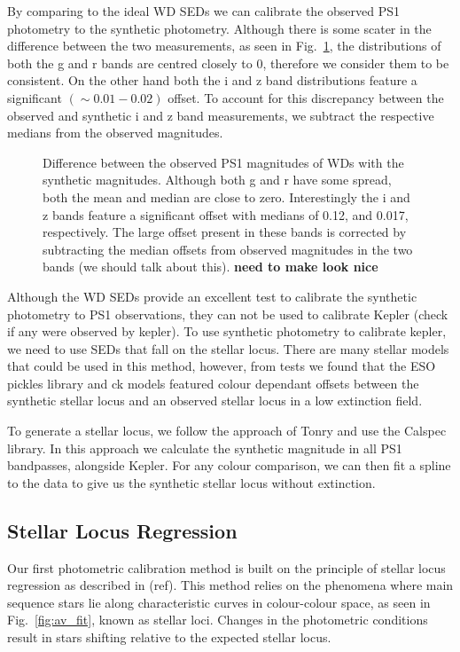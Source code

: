 \documentclass{aastex63}
\begin{document}
By comparing to the ideal WD SEDs we can calibrate the observed PS1 photometry to the synthetic photometry. Although there is some scater in the difference between the two measurements, as seen in Fig.~\ref{fig:wd}, the distributions of both the g and r bands are centred closely to 0, therefore we consider them to be consistent. On the other hand both the i and z band distributions feature a significant $(\sim 0.01-0.02)$ offset. To account for this discrepancy between the observed and synthetic i and z band measurements, we subtract the respective medians from the observed magnitudes. 

\begin{figure}
\caption{Difference between the observed PS1 magnitudes of WDs with the synthetic magnitudes. Although both g and r have some spread, both the mean and median are close to zero. Interestingly the i and z bands feature a significant offset with medians of 0.12, and 0.017, respectively. The large offset present in these bands is corrected by subtracting the median offsets from observed magnitudes in the two bands (we should talk about this). \textbf{need to make look nice}  \label{fig:wd}}
\end{figure}

Although the WD SEDs provide an excellent test to calibrate the synthetic photometry to PS1 observations, they can not be used to calibrate Kepler (check if any were observed by kepler). To use synthetic photometry to calibrate kepler, we need to use SEDs that fall on the stellar locus. There are many stellar models that could be used in this method, however, from tests we found that the ESO pickles library and ck models featured colour dependant offsets between the synthetic stellar locus and an observed stellar locus in a low extinction field. 

To generate a stellar locus, we follow the approach of Tonry and use the Calspec library. In this approach we calculate the synthetic magnitude in all PS1 bandpasses, alongside Kepler. For any colour comparison, we can then fit a spline to the data to give us the synthetic stellar locus without extinction. 

\subsection{Stellar Locus Regression}

Our first photometric calibration method is built on the principle of stellar locus regression as described in (ref). This method relies on the phenomena where main sequence stars lie along characteristic curves in colour-colour space, as seen in Fig.~\ref{fig:av_fit}, known as stellar loci. Changes in the photometric conditions result in stars shifting relative to the expected stellar locus.
\end{document}
